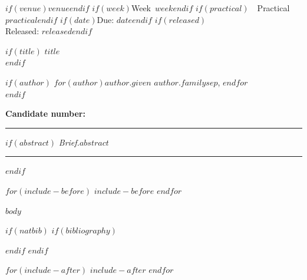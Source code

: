 \documentclass[$if(fontsize)$$fontsize$,$else$11pt,$endif$$if(papersize)$$papersize$paper,$else$a4paper,$endif$$for(classoption)$$classoption$$sep$,$endfor$]{article}
\begin{document}
\noindent
{\small
$if(venue)$$venue$$endif$
$if(week)$\hfill Week~$week$$endif$
$if(practical)$\ \textbullet\ Practical~$practical$$endif$
$if(date)$\hfill Due: $date$$endif$
$if(released)$\\Released: $released$$endif$
}

\vspace{0.6em}

$if(title)$
{\LARGE\bfseries $title$}\\[0.4em]
$endif$

$if(author)$
{\large $for(author)$$author.given$ $author.family$$sep$, $endfor$}\\[0.6em]
$endif$

\noindent\textbf{Candidate number:}\enspace\underline{\hspace{4.5cm}}

\vspace{0.8em}
\hrule
\vspace{0.8em}

$if(abstract)$
\noindent\textit{Brief.}\enspace $abstract$

\vspace{0.6em}
\hrule
\vspace{0.8em}
$endif$

$for(include-before)$
$include-before$
$endfor$


$body$


$if(natbib)$
$if(bibliography)$

$endif$
$endif$

$for(include-after)$
$include-after$
$endfor$
\end{document}
